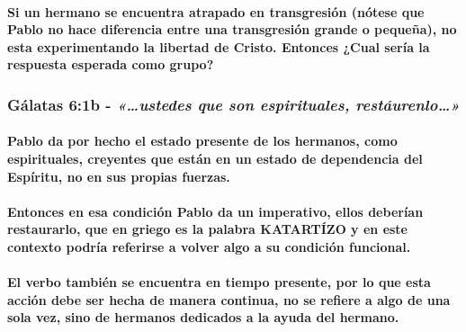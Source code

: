 \documentclass[11a pt,twoside]{article}
\newcommand{\scripture}[1]{%
  {\fontsize{12pt}{16pt}\selectfont\ScriptureFont\itshape #1}%
}
\let\oldsubsubsection\subsubsection
\renewcommand{\subsubsection}{\needspace{4\baselineskip}\oldsubsubsection}
\let\oldparagraph\paragraph
\renewcommand{\paragraph}{\needspace{3\baselineskip}\oldparagraph}
\begin{document}
\paragraph{Si un hermano se encuentra atrapado en transgresión (nótese
que Pablo no hace diferencia entre una transgresión grande o pequeña),
no esta experimentando la libertad de Cristo. Entonces ¿Cual sería la
respuesta esperada como
grupo?}\label{si-un-hermano-se-encuentra-atrapado-en-transgresiuxf3n-nuxf3tese-que-pablo-no-hace-diferencia-entre-una-transgresiuxf3n-grande-o-pequeuxf1a-no-esta-experimentando-la-libertad-de-cristo.-entonces-cual-seruxeda-la-respuesta-esperada-como-grupo}

\subsubsection{\texorpdfstring{Gálatas 6:1b -
\scripture{«…ustedes que son espirituales, restáurenlo…»}}{Gálatas 6:1b - }}\label{guxe1latas-61b---ustedes-que-son-espirituales-restuxe1urenlo}

\paragraph{Pablo da por hecho el estado presente de los hermanos, como
espirituales, creyentes que están en un estado de dependencia del
Espíritu, no en sus propias
fuerzas.}\label{pablo-da-por-hecho-el-estado-presente-de-los-hermanos-como-espirituales-creyentes-que-estuxe1n-en-un-estado-de-dependencia-del-espuxedritu-no-en-sus-propias-fuerzas.}

\paragraph{Entonces en esa condición Pablo da un imperativo, ellos
deberían restaurarlo, que en griego es la palabra KATARTÍZO y en este
contexto podría referirse a volver algo a su condición
funcional.}\label{entonces-en-esa-condiciuxf3n-pablo-da-un-imperativo-ellos-deberuxedan-restaurarlo-que-en-griego-es-la-palabra-katartuxedzo-y-en-este-contexto-podruxeda-referirse-a-volver-algo-a-su-condiciuxf3n-funcional.}

\paragraph{El verbo también se encuentra en tiempo presente, por lo que
esta acción debe ser hecha de manera continua, no se refiere a algo de
una sola vez, sino de hermanos dedicados a la ayuda del
hermano.}\label{el-verbo-tambiuxe9n-se-encuentra-en-tiempo-presente-por-lo-que-esta-acciuxf3n-debe-ser-hecha-de-manera-continua-no-se-refiere-a-algo-de-una-sola-vez-sino-de-hermanos-dedicados-a-la-ayuda-del-hermano.}
\end{document}
